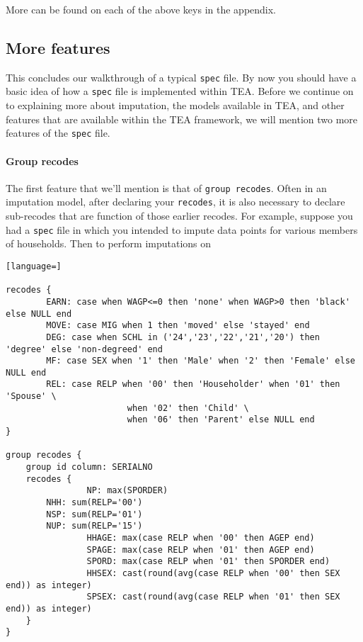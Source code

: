 \documentclass{article}
\begin{document}
More can be found on each of the above keys in the appendix.

\subsection{More features}
This concludes our walkthrough of a typical {\tt spec} file. By now you should have a basic idea of 
how a {\tt spec} file is implemented within TEA. Before we continue on to explaining more about imputation, 
the models available in TEA, and other features that are available within the TEA framework, we will mention 
two more features of the {\tt spec} file.


\paragraph{Group recodes} The first feature that we'll mention is that of {\tt group recodes}. 
Often in an imputation model, after declaring your {\tt recodes}, it is also necessary to declare 
sub-recodes that are function of those earlier recodes. For example, suppose you had a {\tt spec} file 
in which you intended to impute data points for various members of households. Then to perform imputations 
on 


\begin{lstlisting}[language=]

recodes {
        EARN: case when WAGP<=0 then 'none' when WAGP>0 then 'black' else NULL end
        MOVE: case MIG when 1 then 'moved' else 'stayed' end
        DEG: case when SCHL in ('24','23','22','21','20') then 'degree' else 'non-degreed' end
        MF: case SEX when '1' then 'Male' when '2' then 'Female' else NULL end
        REL: case RELP when '00' then 'Householder' when '01' then 'Spouse' \
                        when '02' then 'Child' \
                        when '06' then 'Parent' else NULL end
}

group recodes {
    group id column: SERIALNO
    recodes {
                NP: max(SPORDER)
        NHH: sum(RELP='00')
        NSP: sum(RELP='01')
        NUP: sum(RELP='15')
                HHAGE: max(case RELP when '00' then AGEP end)
                SPAGE: max(case RELP when '01' then AGEP end)
                SPORD: max(case RELP when '01' then SPORDER end)
                HHSEX: cast(round(avg(case RELP when '00' then SEX end)) as integer)
                SPSEX: cast(round(avg(case RELP when '01' then SEX end)) as integer)
    }
}



\end{lstlisting}
\end{document}
